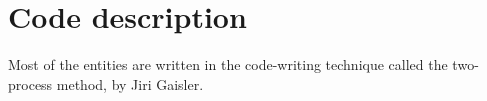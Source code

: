 \newpage
\chapter{Code description}
Most of the entities are written in the code-writing technique called the two-process method, by Jiri Gaisler. 